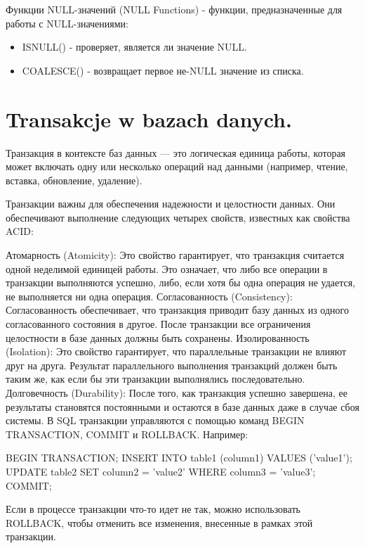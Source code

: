 
Функции NULL-значений (NULL Functions) - функции, предназначенные для работы с NULL-значениями:
\begin{itemize}
\item ISNULL() - проверяет, является ли значение NULL.
\item COALESCE() - возвращает первое не-NULL значение из списка.
\end{itemize}

\section{Transakcje w bazach danych. }


Транзакция в контексте баз данных — это логическая единица работы, которая может включать одну или несколько операций над данными (например, чтение, вставка, обновление, удаление).

Транзакции важны для обеспечения надежности и целостности данных. Они обеспечивают выполнение следующих четырех свойств, известных как свойства ACID:

Атомарность (Atomicity): Это свойство гарантирует, что транзакция считается одной неделимой единицей работы. Это означает, что либо все операции в транзакции выполняются успешно, либо, если хотя бы одна операция не удается, не выполняется ни одна операция.
Согласованность (Consistency): Согласованность обеспечивает, что транзакция приводит базу данных из одного согласованного состояния в другое. После транзакции все ограничения целостности в базе данных должны быть сохранены.
Изолированность (Isolation): Это свойство гарантирует, что параллельные транзакции не влияют друг на друга. Результат параллельного выполнения транзакций должен быть таким же, как если бы эти транзакции выполнялись последовательно.
Долговечность (Durability): После того, как транзакция успешно завершена, ее результаты становятся постоянными и остаются в базе данных даже в случае сбоя системы.
В SQL транзакции управляются с помощью команд BEGIN TRANSACTION, COMMIT и ROLLBACK. Например:


BEGIN TRANSACTION;
INSERT INTO table1 (column1) VALUES ('value1');
UPDATE table2 SET column2 = 'value2' WHERE column3 = 'value3';
COMMIT;

Если в процессе транзакции что-то идет не так, можно использовать ROLLBACK, чтобы отменить все изменения, внесенные в рамках этой транзакции.